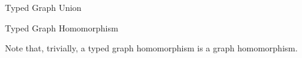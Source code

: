 \begin{definition}{Typed Graph Union\\}
\label{def:typed_graph_union}
\end{definition}


\begin{definition}{Typed Graph Homomorphism\\}
\label{def:typed_graph_homomorphism}
\end{definition}


Note that, trivially, a typed graph homomorphism is a graph homomorphism.

% 
% 


% 

